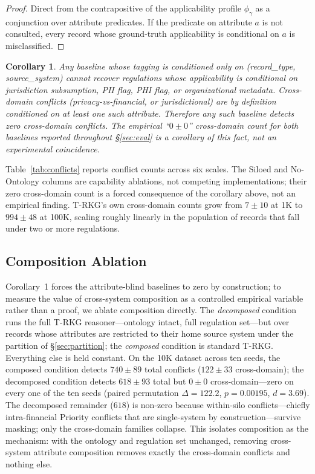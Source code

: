 \documentclass{ieeeaccess}
\newtheorem{corollary}{Corollary}
\begin{document}
\begin{proof}
Direct from the contrapositive of the applicability profile $\phi_\gamma$ as a conjunction over attribute predicates. If the predicate on attribute $a$ is not consulted, every record whose ground-truth applicability is conditional on $a$ is misclassified.
\end{proof}

\begin{corollary}
Any baseline whose tagging is conditioned only on (record\_type, source\_system) cannot recover regulations whose applicability is conditional on jurisdiction subsumption, PII flag, PHI flag, or organizational metadata. Cross-domain conflicts (privacy-vs-financial, or jurisdictional) are by definition conditioned on at least one such attribute. Therefore any such baseline detects zero cross-domain conflicts. The empirical ``$0 \pm 0$'' cross-domain count for both baselines reported throughout §\ref{sec:eval} is a corollary of this fact, not an experimental coincidence.
\end{corollary}

Table~\ref{tab:conflicts} reports conflict counts across six scales. The Siloed and No-Ontology columns are capability ablations, not competing implementations; their zero cross-domain count is a forced consequence of the corollary above, not an empirical finding. T-RKG's own cross-domain counts grow from $7 \pm 10$ at 1K to $994 \pm 48$ at 100K, scaling roughly linearly in the population of records that fall under two or more regulations.

\subsection{Composition Ablation}
\label{sec:composition}

Corollary~1 forces the attribute-blind baselines to zero by construction; to measure the value of cross-system composition as a controlled empirical variable rather than a proof, we ablate composition directly. The \emph{decomposed} condition runs the full T-RKG reasoner---ontology intact, full regulation set---but over records whose attributes are restricted to their home source system under the partition of §\ref{sec:partition}; the \emph{composed} condition is standard T-RKG. Everything else is held constant. On the 10K dataset across ten seeds, the composed condition detects $740 \pm 89$ total conflicts ($122 \pm 33$ cross-domain); the decomposed condition detects $618 \pm 93$ total but $0 \pm 0$ cross-domain---zero on every one of the ten seeds (paired permutation $\Delta = 122.2$, $p = 0.00195$, $d = 3.69$). The decomposed remainder ($618$) is non-zero because within-silo conflicts---chiefly intra-financial Priority conflicts that are single-system by construction---survive masking; only the cross-domain families collapse. This isolates composition as the mechanism: with the ontology and regulation set unchanged, removing cross-system attribute composition removes exactly the cross-domain conflicts and nothing else.
\end{document}
